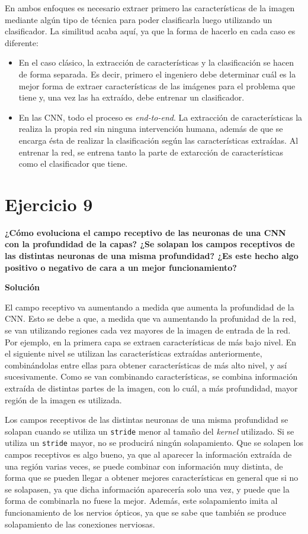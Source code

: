 \documentclass[11pt,a4paper]{article}
\newcommand{\answer}{\noindent\textbf{Solución}}
\newcommand{\question}[1]{\noindent\textbf{#1}}
\newcommand{\nonumsection}[1]{\section*{#1}\addcontentsline{toc}{section}{#1}}
\begin{document}
En ambos enfoques es necesario extraer primero las características de
la imagen mediante algún tipo de técnica para poder clasificarla luego
utilizando un clasificador. La similitud acaba aquí, ya que
la forma de hacerlo en cada caso es diferente:

\begin{itemize}[label=\textbullet]
  \item En el caso clásico, la extracción de características y la
  clasificación se hacen de forma separada. Es decir, primero el ingeniero
  debe determinar cuál es la mejor forma de extraer características de las
  imágenes para el problema que tiene y, una vez las ha extraído, debe
  entrenar un clasificador.
  \item En las CNN, todo el proceso es \textit{end-to-end}. La extracción
  de características la realiza la propia red sin ninguna intervención humana,
  además de que se encarga ésta de realizar la clasificación según las características
  extraídas. Al entrenar la red, se entrena tanto la parte de extarcción
  de características como el clasificador que tiene.
\end{itemize}


\nonumsection{Ejercicio 9}

\question{¿Cómo evoluciona el campo receptivo de las neuronas de una CNN
con la profundidad de la capas? ¿Se solapan los campos receptivos de
las distintas neuronas de una misma profundidad? ¿Es este hecho algo
positivo o negativo de cara a un mejor funcionamiento?}

\answer

El campo receptivo va aumentando a medida que aumenta la profundidad de la
CNN. Esto se debe a que, a medida que va aumentando la profunidad de la red,
se van utilizando regiones cada vez mayores de la imagen de entrada de la red.
Por ejemplo, en la primera capa se extraen características de más bajo nivel. En
el siguiente nivel se utilizan las características extraídas anteriormente,
combinándolas entre ellas para obtener características de más alto nivel, y así
sucesivamente. Como se van combinando características, se combina información extraída
de distintas partes de la imagen, con lo cuál, a más profundidad, mayor región
de la imagen es utilizada.

Los campos receptivos de las distintas neuronas de una misma profundidad
se solapan cuando se utiliza un \texttt{stride} menor al tamaño del
\textit{kernel} utilizado. Si se utiliza un \texttt{stride} mayor, no
se producirá ningún solapamiento. Que se solapen los campos receptivos es algo
bueno, ya que al aparecer la información extraída de una región varias veces,
se puede combinar con información muy distinta, de forma que se pueden llegar a
obtener mejores características en general que si no se solapasen, ya que dicha
información aparecería solo una vez, y puede que la forma de combinarla no fuese
la mejor. Además, este solapamiento imita al funcionamiento de los nervios ópticos,
ya que se sabe que también se produce solapamiento de las conexiones nerviosas.
\end{document}
